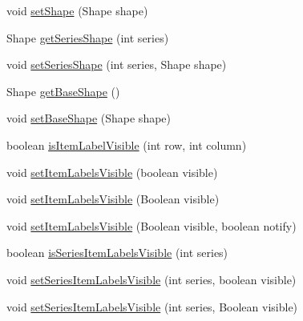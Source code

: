 \begin{DoxyCompactItemize}
\item 
void \mbox{\hyperlink{interfaceorg_1_1jfree_1_1chart_1_1renderer_1_1category_1_1_category_item_renderer_a31d736c92ccf489113d8da36ab2065ef}{set\+Shape}} (Shape shape)
\item 
Shape \mbox{\hyperlink{interfaceorg_1_1jfree_1_1chart_1_1renderer_1_1category_1_1_category_item_renderer_a96f427b0799a82075fd19cc7be37de45}{get\+Series\+Shape}} (int series)
\item 
void \mbox{\hyperlink{interfaceorg_1_1jfree_1_1chart_1_1renderer_1_1category_1_1_category_item_renderer_abf0baf3c766531b4be3a3f830d6f4685}{set\+Series\+Shape}} (int series, Shape shape)
\item 
Shape \mbox{\hyperlink{interfaceorg_1_1jfree_1_1chart_1_1renderer_1_1category_1_1_category_item_renderer_aa2f1c91f2cc80bc26e5e4e2506aa6f69}{get\+Base\+Shape}} ()
\item 
void \mbox{\hyperlink{interfaceorg_1_1jfree_1_1chart_1_1renderer_1_1category_1_1_category_item_renderer_a239cddb1eab54345044f1a4eb430eb03}{set\+Base\+Shape}} (Shape shape)
\item 
boolean \mbox{\hyperlink{interfaceorg_1_1jfree_1_1chart_1_1renderer_1_1category_1_1_category_item_renderer_a66d6f6e5d321583a923cfbad21e4161e}{is\+Item\+Label\+Visible}} (int row, int column)
\item 
void \mbox{\hyperlink{interfaceorg_1_1jfree_1_1chart_1_1renderer_1_1category_1_1_category_item_renderer_af9ce871487627fca00bd5b7b4ddc6306}{set\+Item\+Labels\+Visible}} (boolean visible)
\item 
void \mbox{\hyperlink{interfaceorg_1_1jfree_1_1chart_1_1renderer_1_1category_1_1_category_item_renderer_ae8cdb257a01b5dc8cd2dffc97b5564fc}{set\+Item\+Labels\+Visible}} (Boolean visible)
\item 
void \mbox{\hyperlink{interfaceorg_1_1jfree_1_1chart_1_1renderer_1_1category_1_1_category_item_renderer_a67bf770b8f51b4d493c89749e976d1da}{set\+Item\+Labels\+Visible}} (Boolean visible, boolean notify)
\item 
boolean \mbox{\hyperlink{interfaceorg_1_1jfree_1_1chart_1_1renderer_1_1category_1_1_category_item_renderer_ab37b75d719d1386f107829cddf9eb1b2}{is\+Series\+Item\+Labels\+Visible}} (int series)
\item 
void \mbox{\hyperlink{interfaceorg_1_1jfree_1_1chart_1_1renderer_1_1category_1_1_category_item_renderer_ad72cb071960bce31455a5ec1244d5532}{set\+Series\+Item\+Labels\+Visible}} (int series, boolean visible)
\item 
void \mbox{\hyperlink{interfaceorg_1_1jfree_1_1chart_1_1renderer_1_1category_1_1_category_item_renderer_a123a2563ae40ed6a21ab4ace1c8c92ab}{set\+Series\+Item\+Labels\+Visible}} (int series, Boolean visible)

\end{DoxyCompactItemize}
